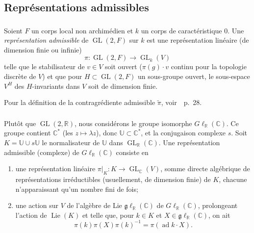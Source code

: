 \documentclass[11pt,a4paper]{amsart}
\theoremstyle{plain}
\theoremstyle{definition}
\theoremstyle{remark}
\DeclareMathOperator{\GL}{GL}
\DeclareMathOperator{\ad}{ad}
\newcommand{\RR}{\mathbb{R}}
\newcommand{\CC}{\mathbb{C}}
\newcommand{\Lie}{\operatorname{Lie}}
\begin{document}
\subsection{Repr\'esentations admissibles}

\subsubsection{}
\label{sec:0.2.1}

Soient $F$ un corps local non archim\'edien et $k$ un corps de caract\'eristique $0$. Une \emph{repr\'esentation admissible} de $\GL(2,F)$ sur $k$ est une repr\'esentation lin\'eaire (de dimension finie ou infinie)
\[ \pi: \GL(2,F) \longrightarrow \GL_k(V) \]
telle que le stabilisateur de $v \in V$ soit ouvert ($\pi(g)\cdot v$ continu pour la topologie discr\`ete de $V$) et que pour $H \subset \GL(2,F)$ un sous-groupe ouvert, le sous-espace $V^H$ des $H$-invariants dans $V$ soit de dimension finie.

Pour la d\'efinition de la contragr\'ediente admissible $\widetilde{\pi}$, voir~\cite{JL}~p.~28.

\subsubsection{}
\label{sec:0.2.2}

Plut\^ot que $\GL(2,\RR)$, nous consid\'erons le groupe isomorphe $G\ell_{\RR}(\CC)$. Ce groupe contient $\CC^*$ (les $z \mapsto \lambda z$), donc $\mathbb{U} \subset \CC^*$, et la conjugaison complexe $s$. Soit $K = \mathbb{U} \cup s\mathbb{U}$ le normalisateur de $\mathbb{U}$ dans $\GL_{\RR}(\CC)$. Une repr\'esentation admissible (complexe) de $G\ell_{\RR}(\CC)$ consiste en

\begin{enumerate}
\item[(a)] une repr\'esentation lin\'eaire $\pi|_K: K \to \GL_{\CC}(V)$, somme directe alg\'ebrique de repr\'esentations irr\'eductibles (usuellement, de dimension finie) de $K$, chacune n'apparaissant qu'un nombre fini de fois;

\item[(b)] une action sur $V$ de l'alg\`ebre de Lie $\mathfrak{g}\ell_{\RR}(\CC)$ de $G\ell_{\RR}(\CC)$, prolongeant l'action de $\Lie(K)$ et telle que, pour $k \in K$ et $X \in \mathfrak{g}\ell_{\RR}(\CC)$, on ait
\begin{equation} \label{eq:0.2.2.1}
\pi(k)\pi(X)\pi(k)^{-1} = \pi(\ad k \cdot X).
\end{equation}
\end{enumerate}
\end{document}
